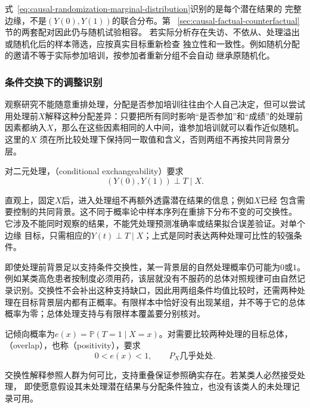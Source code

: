 式~\eqref{eq:causal-randomization-marginal-distribution}识别的是每个潜在结果的
完整边缘，不是\((Y(0),Y(1))\)的联合分布。第
~\ref{sec:causal-factual-counterfactual}节的两套配对因此仍与随机试验相容。
若实际分析存在失访、不依从、处理溢出或随机化后的样本筛选，应按真实目标重新检查
独立性和一致性。例如随机分配的邀请不等于实际参加培训，按参加者重新分组不会自动
继承原随机化。

\subsubsection{条件交换下的调整识别}
\label{sec:causal-adjustment-identification}

观察研究不能随意重排处理，分配是否参加培训往往由个人自己决定，但可以尝试用处理前\(X\)解释这种分配差异：只要把所有同时影响“是否参加”和“成绩”的处理前因素都纳入\(X\)，那么在这些因素相同的人中间，谁参加培训就可以看作近似随机。这里的\(X\)
须在所比较处理下保持同一取值和含义，否则两组不再按共同背景分层。
\begin{definition}[条件交换性]
  \label{def:causal-conditional-exchangeability}
  对二元处理，（conditional exchangeability）要求
  \begin{equation}
    (Y(0),Y(1))\perp T\mid X.
    \label{eq:causal-conditional-exchangeability}
  \end{equation}
\end{definition}
直观上，固定\(X\)后，进入处理组不再额外透露潜在结果的信息；例如\(X\)已经
包含需要控制的共同背景。这不同于概率论中样本序列在重排下分布不变的可交换性。
它涉及不能同时观察的结果，不能凭处理预测准确率或结果拟合误差验证。对单个边缘
目标，只需相应的\(Y(t)\perp T\mid X\)；上式是同时表达两种处理可比性的较强条件。

即使处理前背景足以支持条件交换性，某一背景层的自然处理概率仍可能为\(0\)或\(1\)。例如某类高危患者按制度必须用药，该层就没有不服药的总体对照规律可由自然记录识别。交换性不会补出这种支持缺口，因此用两组条件均值比较时，还需两种处理在目标背景层内都有正概率。有限样本中恰好没有出现某组，并不等于它的总体概率为零；总体处理支持与有限样本覆盖要分别核对。
\begin{definition}[二元处理的支持重叠]
  \label{def:causal-overlap}
  记倾向概率为\(e(x)=\mathbb P(T=1\mid X=x)\)。对需要比较两种处理的目标总体，
  （overlap），也称（positivity），要求
  \begin{equation}
    0<e(x)<1,\qquad P_X\text{几乎处处}.
    \label{eq:causal-overlap}
  \end{equation}
\end{definition}
交换性解释参照人群为何可比，支持重叠保证参照确实存在。若某类人必然接受处理，
即使愿意假设其未处理潜在结果与分配条件独立，也没有该类人的未处理记录可用。

